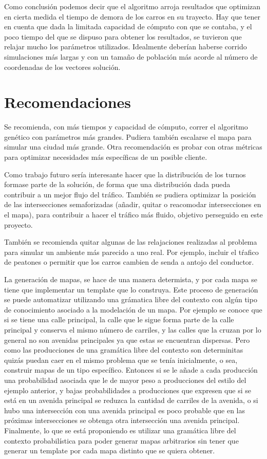 \documentclass[colorinlistoftodos,twoside,twocolumn]{article} %
\begin{document}
	Como conclusi\'on podemos decir que el algoritmo arroja resultados que optimizan en cierta medida el tiempo de demora de los carros en su trayecto. Hay que tener en cuenta que dada la limitada capacidad de c\'omputo con que se contaba, y el poco tiempo del que se dispuso para obtener los resultados, se tuvieron que relajar mucho los par\'ametros utilizados. Idealmente deber\'ian haberse corrido simulaciones m\'as largas y con un tama\~no de poblaci\'on m\'as acorde al n\'umero de coordenadas de los vectores soluci\'on.

	\section{Recomendaciones}
	
	Se recomienda, con m\'as tiempos y capacidad de c\'omputo, correr el algoritmo gen\'etico con par\'ametros m\'as grandes. Pudiera tambi\'en escalarse el mapa para simular una ciudad m\'as grande. Otra recomendaci\'on es probar con otras m\'etricas para optimizar necesidades m\'as espec\'ificas de un posible cliente.
	
	Como trabajo futuro ser\'ia interesante hacer que la distribuci\'on de los turnos formase parte de la soluci\'on, de forma que una distribuci\'on dada pueda contribuir a un mejor flujo del tr\'afico. Tambi\'en se pudiera optimizar la posici\'on de las intersecciones semaforizadas (a\~nadir, quitar o reacomodar intersecciones en el mapa), para contribuir a hacer el tr\'afico m\'as fluido, objetivo perseguido en este proyecto.
	
	Tambi\'en se recomienda quitar algunas de las relajaciones realizadas al problema para simular un ambiente m\'as parecido  a uno real. Por ejemplo, incluir el t\'rafico de peatones o permitir que los carros cambien de senda a antojo del conductor.
	
	La generación de mapas, se hace de una manera determista, y por cada mapa se tiene que implementar un template que lo construya. Este proceso de generación se puede automatizar utilizando una grámatica libre del contexto con algún tipo de conocimiento asociado a la modelación de un mapa. Por ejemplo se conoce que si se tiene una calle principal, la calle que le sigue forma parte de la calle principal y conserva el mismo número de carriles, y las calles que la cruzan por lo general no son avenidas principales ya que estas se encuentran dispersas. Pero como las producciones de una gramática libre del contexto son determinitas quizás puedan caer en el mismo problema que se tenía inicialmente, o sea, construir mapas de un tipo específico. Entonces si se le añade a cada producción una probabilidad asociada que le de mayor peso a producciones del estilo del ejemplo anterior, y bajas probabilidades a producciones que expresen que si se está en un avenida principal se reduzca la cantidad de carriles de la avenida, o si hubo una intersección con una avenida principal es poco probable que en las próximas intersecciones se obtenga otra intersección una avenida principal. Finalmente, lo que se está proponiendo es utilizar una gramática libre del contexto probabilística para poder generar mapas arbitrarios sin tener que generar un template por cada mapa distinto que se quiera obtener.
\end{document}
